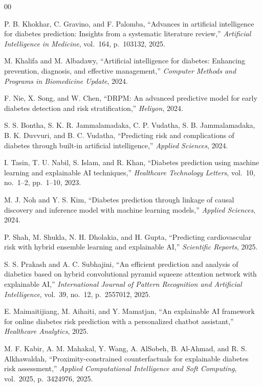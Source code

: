 \documentclass[conference]{IEEEtran}
\begin{document}
\begin{thebibliography}{00}

 P. B. Khokhar, C. Gravino, and F. Palomba, ``Advances in artificial intelligence for diabetes prediction: Insights from a systematic literature review,'' \textit{Artificial Intelligence in Medicine}, vol.~164, p.~103132, 2025.

 M. Khalifa and M. Albadawy, ``Artificial intelligence for diabetes: Enhancing prevention, diagnosis, and effective management,'' \textit{Computer Methods and Programs in Biomedicine Update}, 2024.

 F. Nie, X. Song, and W. Chen, ``DRPM: An advanced predictive model for early diabetes detection and risk stratification,'' \textit{Heliyon}, 2024.

 S. S. Bontha, S. K. R. Jammalamadaka, C. P. Vudatha, S. B. Jammalamadaka, B. K. Duvvuri, and B. C. Vudatha, ``Predicting risk and complications of diabetes through built-in artificial intelligence,'' \textit{Applied Sciences}, 2024.

 I. Tasin, T. U. Nabil, S. Islam, and R. Khan, ``Diabetes prediction using machine learning and explainable AI techniques,'' \textit{Healthcare Technology Letters}, vol.~10, no.~1--2, pp.~1--10, 2023.

 M. J. Noh and Y. S. Kim, ``Diabetes prediction through linkage of causal discovery and inference model with machine learning models,'' \textit{Applied Sciences}, 2024.

 P. Shah, M. Shukla, N. H. Dholakia, and H. Gupta, ``Predicting cardiovascular risk with hybrid ensemble learning and explainable AI,'' \textit{Scientific Reports}, 2025.

 S. S. Prakash and A. C. Subhajini, ``An efficient prediction and analysis of diabetics based on hybrid convolutional pyramid squeeze attention network with explainable AI,'' \textit{International Journal of Pattern Recognition and Artificial Intelligence}, vol.~39, no.~12, p.~2557012, 2025.

 E. Maimaitijiang, M. Aihaiti, and Y. Mamatjan, ``An explainable AI framework for online diabetes risk prediction with a personalized chatbot assistant,'' \textit{Healthcare Analytics}, 2025.

 M. F. Kabir, A. M. Mahakal, Y. Wang, A. AlSobeh, B. Al-Ahmad, and R. S. Alkhawaldah, ``Proximity-constrained counterfactuals for explainable diabetes risk assessment,'' \textit{Applied Computational Intelligence and Soft Computing}, vol.~2025, p.~3424976, 2025.


\end{thebibliography}
\end{document}
